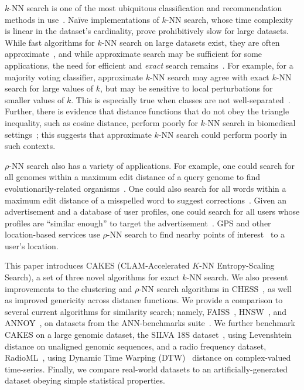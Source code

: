 $k$-NN search is one of the most ubiquitous classification and recommendation methods in use~\cite{fix1952discriminatory, cover1967nearest}.
Na\"{i}ve implementations of $k$-NN search, whose time complexity is linear in the dataset's cardinality, prove prohibitively slow for large datasets.
While fast algorithms for $k$-NN search on large datasets exist, they are often approximate~\cite{gao2023high}, and while approximate search may be sufficient for some applications, the need for efficient and \textit{exact} search remains~\cite{ukey2023survey}.
For example, for a majority voting classifier, approximate $k$-NN search may agree with exact $k$-NN search for large values of $k$, but may be sensitive to local perturbations for smaller values of $k$.
This is especially true when classes are not well-separated~\cite{zhang2022imbalanced}.
Further, there is evidence that distance functions that do not obey the triangle inequality, such as cosine distance, perform poorly for $k$-NN search in biomedical settings~\cite{hu2016distance};
this suggests that approximate $k$-NN search could perform poorly in such contexts.

$\rho$-NN search also has a variety of applications.
For example, one could search for all genomes within a maximum edit distance of a query genome to find evolutionarily-related organisms~\cite{budowski2010fragbag}.
One could also search for all words within a maximum edit distance of a misspelled word to suggest corrections~\cite{ukkonen1985algorithms}.
Given an advertisement and a database of user profiles, one could search for all users whose profiles are ``similar enough'' to target the advertisement~\cite{zhang2020privacy}.
GPS and other location-based services use $\rho$-NN search to find nearby points of interest~\cite{zhang2020privacy} to a user's location.

This paper introduces CAKES (CLAM-Accelerated $K$-NN Entropy-Scaling Search), a set of three novel algorithms for exact $k$-NN search.
We also present improvements to the clustering and $\rho$-NN search algorithms in CHESS~\cite{ishaq2019clustered}, as well as improved genericity across distance functions.
We provide a comparison to several current algorithms for similarity search; namely, FAISS~\cite{johnson2019billion}, HNSW~\cite{malkov2016hnsw}, and ANNOY~\cite{annoy}, on datasets from the ANN-benchmarks suite~\cite{aumuller2020ann}.
We further benchmark CAKES on a large genomic dataset, the SILVA 18S dataset~\cite{10.1093/nar/gks1219}, using Levenshtein~\cite{levenshtein1966binary} distance on unaligned genomic sequences, and a radio frequency dataset, RadioML~\cite{oshea2018radioml}, using Dynamic Time Warping (DTW)~\cite{gold2018dynamic} distance on complex-valued time-series.
Finally, we compare real-world datasets to an artificially-generated dataset obeying simple statistical properties.



